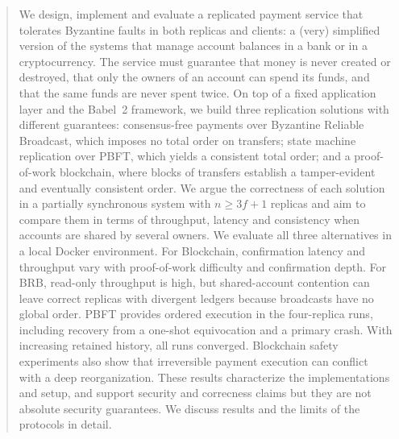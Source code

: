 \documentclass[sigconf,a4paper]{acmart}
\begin{document}
    \begin{abstract}
        We design, implement and evaluate a replicated payment service that
        tolerates Byzantine faults in both replicas and clients: a (very)
        simplified version of the systems that manage account balances in a bank or
        in a cryptocurrency. The service must guarantee that money is never created
        or destroyed, that only the owners of an account can spend its funds, and
        that the same funds are never spent twice. On top of a fixed application
        layer and the Babel~2 framework, we build three replication solutions with
        different guarantees: consensus-free payments over Byzantine Reliable
        Broadcast, which imposes no total order on transfers; state machine
        replication over PBFT, which yields a consistent total order; and a
        proof-of-work blockchain, where blocks of transfers establish a
        tamper-evident and eventually consistent order. We argue the correctness of
        each solution in a partially synchronous system with $n \ge 3f+1$ replicas
        and aim to compare them in terms of throughput, latency and consistency when
        accounts are shared by several owners.
        We evaluate all three alternatives in a local Docker environment. For
        Blockchain, confirmation latency and throughput vary with proof-of-work
        difficulty and confirmation depth. For BRB, read-only throughput is high,
        but shared-account contention can leave correct replicas with divergent
        ledgers because broadcasts have no global order. PBFT provides ordered
        execution in the four-replica runs, including recovery from a one-shot
        equivocation and a primary crash. With increasing retained history,
        all runs converged.
        Blockchain safety experiments also show that irreversible payment
        execution can conflict with a deep reorganization. These results
        characterize the implementations and setup, and support security and correcness
        claims but they are not absolute security guarantees.
        We discuss results and the limits of the protocols in detail.
    \end{abstract}

    \maketitle

\end{document}
